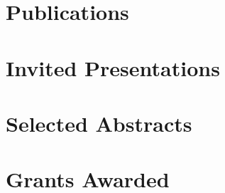 \documentclass[11pt,a4paper,sans]{moderncv}        %
\begin{document}


\section{Publications}


\renewcommand*{\bibliographyhead}[1]{\subsection{Peer-reviewed}}

\nocite{Alexander2018, Johnson2018, Hu2018, Rouco2018,
Haley2017, Harke2017, Moniruzzaman2017, Kujawinski2017, Guy-Haim2017,Durden2017,
Caron2016, Rouco2016,
Alexander2015a, Alexander2015,
Fischer2014, Alexander2012, Dyhrman2012}





\renewcommand*{\bibliographyhead}[1]{\subsection{Pending}}




\section{Invited Presentations}
\renewcommand*{\bibliographyhead}[1]{}



\section{Selected Abstracts}
\renewcommand*{\bibliographyhead}[1]{}




\section{Grants Awarded}
\end{document}
